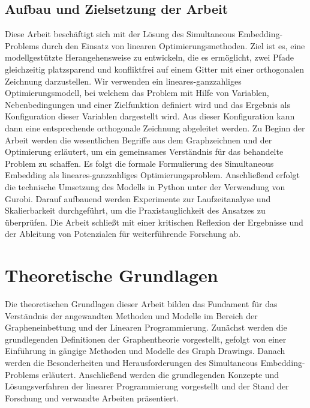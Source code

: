 \documentclass[bachelor, german]{algothesis}
\begin{document}
\section{Aufbau und Zielsetzung der Arbeit}
Diese Arbeit beschäftigt sich mit der Lösung des Simultaneous Embedding-Problems durch den Einsatz von linearen Optimierungsmethoden. Ziel ist es, eine modellgestützte Herangehensweise zu entwickeln, die es ermöglicht, zwei Pfade gleichzeitig platzsparend und konfliktfrei auf einem Gitter mit einer orthogonalen Zeichnung darzustellen. Wir verwenden ein lineares-ganzzahliges Optimierungsmodell, bei welchem das Problem mit Hilfe von Variablen, Nebenbedingungen und einer Zielfunktion definiert wird und das Ergebnis als Konfiguration dieser Variablen dargestellt wird. Aus dieser Konfiguration kann dann eine entsprechende orthogonale Zeichnung abgeleitet werden. \newline
Zu Beginn der Arbeit werden die wesentlichen Begriffe aus dem Graphzeichnen und der Optimierung erläutert, um ein gemeinsames Verständnis für das behandelte Problem zu schaffen. Es folgt die formale Formulierung des Simultaneous Embedding als lineares-ganzzahliges Optimierungsproblem. Anschließend erfolgt die technische Umsetzung des Modells in Python unter der Verwendung von Gurobi. Darauf aufbauend werden Experimente zur Laufzeitanalyse und Skalierbarkeit durchgeführt, um die Praxistauglichkeit des Ansatzes zu überprüfen. Die Arbeit schließt mit einer kritischen Reflexion der Ergebnisse und der Ableitung von Potenzialen für weiterführende Forschung ab.


\chapter{Theoretische Grundlagen}
Die theoretischen Grundlagen dieser Arbeit bilden das Fundament für das Verständnis der angewandten Methoden und Modelle im Bereich der Grapheneinbettung und der Linearen Programmierung. Zunächst werden die grundlegenden Definitionen der Graphentheorie vorgestellt, gefolgt von einer Einführung in gängige Methoden und Modelle des Graph Drawings. Danach werden die Besonderheiten und Herausforderungen des Simultaneous Embedding-Problems erläutert. Anschließend werden die grundlegenden Konzepte und Lösungsverfahren der linearer Programmierung vorgestellt und der Stand der Forschung und verwandte Arbeiten präsentiert.
\end{document}
